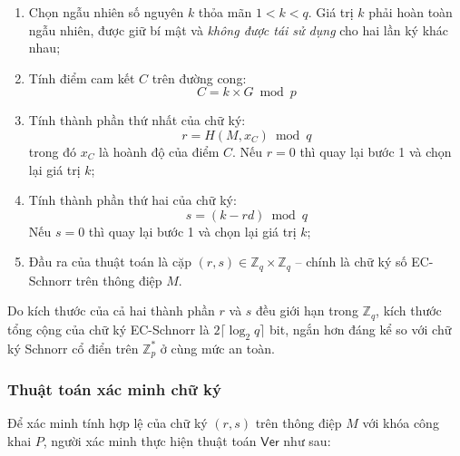 \begin{enumerate}
    \item Chọn ngẫu nhiên số nguyên $k$ thỏa mãn $1 < k < q$. Giá trị $k$ phải hoàn toàn ngẫu nhiên, được giữ bí mật và \textit{không được tái sử dụng} cho hai lần ký khác nhau;
    \item Tính điểm cam kết $C$ trên đường cong:
    \begin{equation}
        C = k \times G \bmod p
        \label{eq:ec-schnorr-sign-c}
    \end{equation}
    \item Tính thành phần thứ nhất của chữ ký:
    \begin{equation}
        r = H(M, x_C) \bmod q
        \label{eq:ec-schnorr-sign-r}
    \end{equation}
    trong đó $x_C$ là hoành độ của điểm $C$. Nếu $r = 0$ thì quay lại bước 1 và chọn lại giá trị $k$;
    \item Tính thành phần thứ hai của chữ ký:
    \begin{equation}
        s = (k - r d) \bmod q
        \label{eq:ec-schnorr-sign-s}
    \end{equation}
    Nếu $s = 0$ thì quay lại bước 1 và chọn lại giá trị $k$;
    \item Đầu ra của thuật toán là cặp $(r, s) \in \mathbb{Z}_q \times \mathbb{Z}_q$ -- chính là chữ ký số EC-Schnorr trên thông điệp $M$.
\end{enumerate}

Do kích thước của cả hai thành phần $r$ và $s$ đều giới hạn trong $\mathbb{Z}_q$, kích thước tổng cộng của chữ ký EC-Schnorr là $2 \lceil \log_2 q \rceil$ bit, ngắn hơn đáng kể so với chữ ký Schnorr cổ điển trên $\mathbb{Z}_p^*$ ở cùng mức an toàn.

\subsubsection{Thuật toán xác minh chữ ký}

Để xác minh tính hợp lệ của chữ ký $(r, s)$ trên thông điệp $M$ với khóa công khai $P$, người xác minh thực hiện thuật toán $\textsf{Ver}$ như sau:

